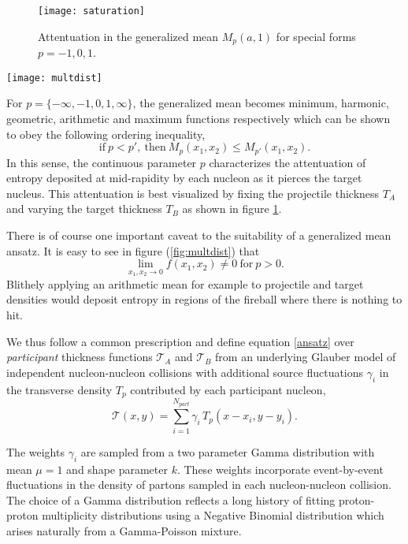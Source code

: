 \documentclass[aps,prl,reprint,amsmath,nofootinbib]{revtex4-1}
\begin{document}
\begin{figure}[b]
  \texttt{[image: saturation]}
  \caption{\label{saturation}Attentuation in the generalized mean $M_p(a, 1)$ for special forms $p=-1, 0, 1$.}
\end{figure}

\begin{figure*}[t]
  \texttt{[image: multdist]}
  \caption{\label{fig:multdist}Minimum bias pp, pPb and PbPb charged particle distributions for power $p=0$,
  fluctuation parameter $k=0.8$ and normalization factor $\kappa'_n$ indicated in the legend.}
\end{figure*}

For $p = \{-\infty,-1,0,1,\infty\}$, the generalized mean becomes minimum, harmonic, geometric, arithmetic and
maximum functions respectively which can be shown to obey the following ordering inequality,
\begin{equation}
  \mathrm{if} ~ p<p', ~ \mathrm{then} ~ M_{p}(x_1,x_2) \le M_{p'}(x_1,x_2).
\end{equation}
In this sense, the continuous parameter $p$ characterizes the attentuation of entropy deposited at
mid-rapidity by each nucleon as it pierces the target nucleus. This attentuation is best visualized by fixing
the projectile thickness $T_A$ and varying the target thickness $T_B$ as shown in figure \ref{saturation}.

There is of course one important caveat to the suitability of a generalized mean ansatz. It is easy to see in
figure (\ref{fig:multdist}) that
\begin{equation}
  \lim\limits_{x_1,x_2 \to 0} f(x_1,x_2) \ne 0 ~\mathrm{for} ~ p>0.
\end{equation}
Blithely applying an arithmetic mean for example to projectile and target densities would deposit entropy in
regions of the fireball where there is nothing to hit.

We thus follow a common prescription and define equation \ref{ansatz} over \emph{participant} thickness
functions $\mathcal{T}_A$ and $\mathcal{T}_B$ from an underlying Glauber model of independent nucleon-nucleon
collisions with additional source fluctuations $\gamma_i$ in the transverse density $T_p$ contributed by each
participant nucleon,
\begin{equation}
  \label{thickness def}
  \mathcal{T}(x,y) = \sum\limits_{i=1}^{N_{part}} \gamma_i\, T_p(x-x_i,y-y_i).
\end{equation}

The weights $\gamma_i$ are sampled from a two parameter Gamma distribution with mean $\mu=1$ and shape
parameter $k$. These weights incorporate event-by-event fluctuations in the density of partons sampled in each
nucleon-nucleon collision. The choice of a Gamma distribution reflects a long history of fitting proton-proton
multiplicity distributions using a Negative Binomial distribution which arises naturally from a Gamma-Poisson
mixture.
\end{document}
